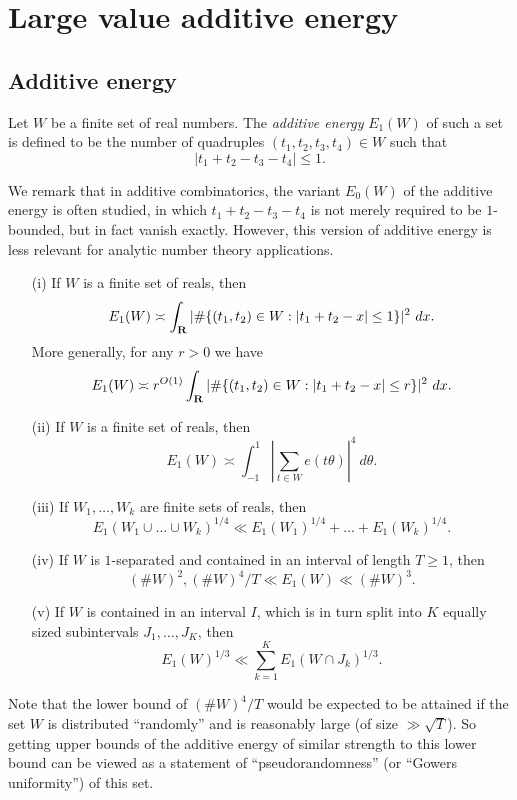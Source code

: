 \chapter{Large value additive energy}

\section{Additive energy}

\begin{definition}\label{add-def}  Let $W$ be a finite set of real numbers.  The \emph{additive energy} $E_1(W)$ of such a set is defined to be the number of quadruples $(t_1,t_2,t_3,t_4) \in W$ such that
$$
|t_1 + t_2 - t_3 - t_4| \leq 1.$$
\end{definition}

We remark that in additive combinatorics, the variant $E_0(W)$ of the additive energy is often studied, in which $t_1+t_2-t_3-t_4$ is not merely required to be $1$-bounded, but in fact vanish exactly.  However, this version of additive energy is less relevant for analytic number theory applications.

\begin{lemma}\label{add-energy}
\begin{itemize}
\item[(i)] If $W$ is a finite set of reals, then
$$ E_1(W) \asymp \int_\R |\# \{ (t_1,t_2) \in W: |t_1+t_2 - x| \leq 1\} |^2\ dx.$$
More generally, for any $r>0$ we have
$$ E_1(W) \asymp r^{O(1)} \int_{\mathbf{R}} |\# \{ (t_1,t_2) \in W: |t_1+t_2 - x| \leq r\} |^2\ dx.$$
\item[(ii)] If $W$ is a finite set of reals, then
$$ E_1(W) \asymp \int_{-1}^1 |\sum_{t \in W} e(t\theta)|^4\ d\theta.$$
\item[(iii)] If $W_1,\dots,W_k$ are finite sets of reals, then
$$ E_1(W_1 \cup \dots \cup W_k)^{1/4} \ll E_1(W_1)^{1/4} + \dots + E_1(W_k)^{1/4}.$$
\item[(iv)]  If $W$ is $1$-separated and contained in an interval of length $T \geq 1$, then
$$ (\# W)^2, (\# W)^4/T \ll E_1(W) \ll (\# W)^3.$$
\item[(v)]  If $W$ is contained in an interval $I$, which is in turn split into $K$ equally sized subintervals $J_1,\dots,J_K$, then
$$ E_1(W)^{1/3} \ll \sum_{k=1}^K E_1(W \cap J_k)^{1/3}.$$
\end{itemize}
\end{lemma}

Note that the lower bound of $(\# W)^4 / T$ would be expected to be attained if the set $W$ is distributed ``randomly'' and is reasonably large (of size $\gg \sqrt{T}$).  So  getting upper bounds of the additive energy of similar strength to this lower bound can be viewed as a statement of ``pseudorandomness'' (or ``Gowers uniformity'') of this set.

